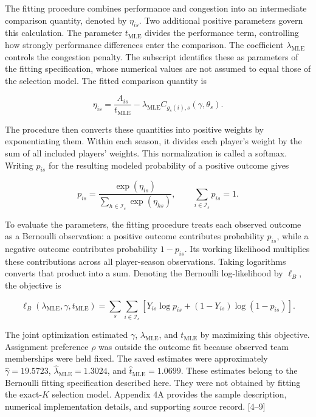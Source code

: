 The fitting procedure combines performance and congestion into an intermediate comparison quantity, denoted by \(\eta_{is}\). Two additional positive parameters govern this calculation. The parameter \(t_{\mathrm{MLE}}\) divides the performance term, controlling how strongly performance differences enter the comparison. The coefficient \(\lambda_{\mathrm{MLE}}\) controls the congestion penalty. The subscript identifies these as parameters of the fitting specification, whose numerical values are not assumed to equal those of the selection model. The fitted comparison quantity is

\[
\eta_{is}=\frac{A_{is}}{t_{\mathrm{MLE}}}-\lambda_{\mathrm{MLE}}C_{g_s(i),s}(\gamma,\theta_s).
\]

The procedure then converts these quantities into positive weights by exponentiating them. Within each season, it divides each player's weight by the sum of all included players' weights. This normalization is called a softmax. Writing \(p_{is}\) for the resulting modeled probability of a positive outcome gives

\[
p_{is}=\frac{\exp(\eta_{is})}{\sum_{h\in\mathcal I_s}\exp(\eta_{hs})},
\qquad
\sum_{i\in\mathcal I_s}p_{is}=1.
\]

To evaluate the parameters, the fitting procedure treats each observed outcome as a Bernoulli observation: a positive outcome contributes probability \(p_{is}\), while a negative outcome contributes probability \(1-p_{is}\). Its working likelihood multiplies these contributions across all player-season observations. Taking logarithms converts that product into a sum. Denoting the Bernoulli log-likelihood by \(\ell_B\), the objective is

\[
\ell_B(\lambda_{\mathrm{MLE}},\gamma,t_{\mathrm{MLE}})=
\sum_s\sum_{i\in\mathcal I_s}\left[
    Y_{is}\log p_{is}+(1-Y_{is})\log(1-p_{is})
    \right].
\]

The joint optimization estimated \(\gamma\), \(\lambda_{\mathrm{MLE}}\), and \(t_{\mathrm{MLE}}\) by maximizing this objective. Assignment preference \(\rho\) was outside the outcome fit because observed team memberships were held fixed. The saved estimates were approximately \(\widehat{\gamma}=19.5723\), \(\widehat{\lambda}_{\mathrm{MLE}}=1.3024\), and \(\widehat{t}_{\mathrm{MLE}}=1.0699\). These estimates belong to the Bernoulli fitting specification described here. They were not obtained by fitting the exact-\(K\) selection model. Appendix 4A provides the sample description, numerical implementation details, and supporting source record. {[}4--9{]}


